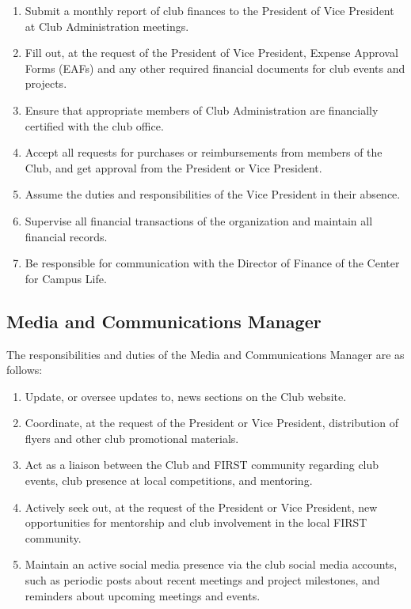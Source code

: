 \documentclass[english,11pt]{article}
\begin{document}
\begin{enumerate}[label=\Alph*.]
\item Submit a monthly report of club finances to the President of Vice President at Club Administration meetings.
\item Fill out, at the request of the President of Vice President, Expense Approval Forms (EAFs) and any other required financial documents for club events and projects.
\item Ensure that appropriate members of Club Administration are financially certified with the club office.
\item Accept all requests for purchases or reimbursements from members of the Club, and get approval from the President or Vice President.
\item Assume the duties and responsibilities of the Vice President in their absence.
\item Supervise all financial transactions of the organization and maintain all financial records.
\item Be responsible for communication with the Director of Finance of the Center for Campus Life.
\end{enumerate}

\subsection{Media and Communications Manager} \label{sect:cadmin:mediacomms}
The responsibilities and duties of the Media and Communications Manager are as follows:

\begin{enumerate}[label=\Alph*.]
\item Update, or oversee updates to, news sections on the Club website.
\item Coordinate, at the request of the President or Vice President, distribution of flyers and other club promotional materials.
\item Act as a liaison between the Club and FIRST community regarding club events, club presence at local competitions, and mentoring.
\item Actively seek out, at the request of the President or Vice President, new opportunities for mentorship and club involvement in the local FIRST community.
\item Maintain an active social media presence via the club social media accounts, such as periodic posts about recent meetings and project milestones, and reminders about upcoming meetings and events.
\end{enumerate}
\end{document}
